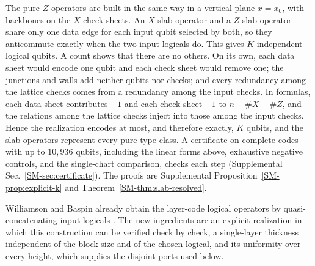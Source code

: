 The pure-$Z$ operators are built in the same way in a vertical plane
$x=x_0$, with backbones on the $X$-check sheets.  An $X$ slab operator and a
$Z$ slab operator share only one data edge for each input qubit selected by
both, so they anticommute exactly when the two input logicals do.  This gives
$K$ independent logical qubits.  A count shows that there are no others.  On
its own, each data sheet would encode one qubit and each check sheet would
remove one; the junctions and walls add neither qubits nor checks; and every
redundancy among the lattice checks comes from a redundancy among the input
checks.  In formulas, each data sheet contributes $+1$ and each check sheet
$-1$ to $n-\#X-\#Z$, and the relations among the lattice checks inject into
those among the input checks.  Hence the realization encodes at most, and
therefore exactly, $K$ qubits, and the slab operators represent every
pure-type class.  A certificate on complete codes
with up to $10{,}936$ qubits, including the linear forms above, exhaustive
negative controls, and the single-chart comparison, checks each step
(Supplemental Sec.~\ref{SM-sec:certificate}). The proofs are Supplemental
Proposition~\ref{SM-prop:explicit-k} and Theorem~\ref{SM-thm:slab-resolved}.

Williamson and Baspin already obtain the layer-code logical operators by
quasi-concatenating input logicals \cite{WilliamsonBaspinLayerCodes}.  The
new ingredients are an explicit realization in which this construction can
be verified check by check, a single-layer thickness independent of the block
size and of the chosen logical, and its uniformity over every height, which
supplies the disjoint ports used below.

